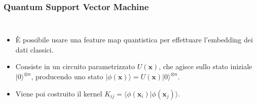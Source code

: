 \documentclass{beamer}
\begin{document}
\begin{frame}

  \frametitle{Quantum Support Vector Machine}
  
  \begin{columns}
  
    \begin{itemize}
      \item<1-> È possibile usare una feature map quantistica per effettuare l'embedding dei dati classici. 
          \item<2-> Consiste in un circuito parametrizzato $U(\mathbf{x})$, che agisce sullo stato iniziale $|0\rangle^{\otimes n}$, producendo uno stato $|\phi(\mathbf{x})\rangle=U(\mathbf{x})|0\rangle^{\otimes n}$.
          \item<3-> Viene poi costruito il kernel $K_{ij}=\langle \phi(\mathbf{x}_i)| \phi(\mathbf{x}_j) \rangle.$
          \end{itemize}
    

\end{columns}
\end{frame}
\end{document}
